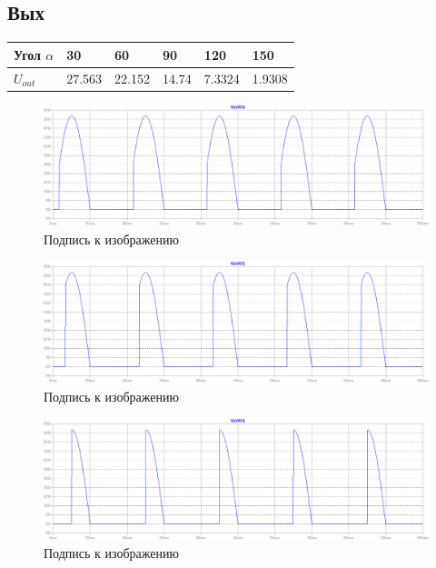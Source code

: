 \documentclass[a4paper, 12pt]{article}
\begin{document}
    \subsection{Вых}
    \begin{center}
    \begin{tabular}{ | m{4em} | m{1.5cm}| m{1.5cm} | m{1.5cm} | m{1.5cm} | m{1.5cm} | } 
    \hline
    Угол $\alpha$& 30 & 60 & 90 &120 &150 \\ 
    \hline
    $U_{out}$& 27.563 & 22.152 & 14.74 &7.3324 &1.9308\\ 
    \hline
    \end{tabular}
    \end{center}


    \begin{figure}[H]
        \centering
        \includegraphics[scale=0.45]{a30.png}
        \captionsetup{skip=0pt}
        \caption{Подпись к изображению}
        \label{fig:a30}
    \end{figure}
    \begin{figure}[H]
        \centering
        \includegraphics[scale=0.45]{a60.png}
        \captionsetup{skip=0pt}
        \caption{Подпись к изображению}
        \label{fig:a60}
    \end{figure}
    \begin{figure}[H]
        \centering
        \includegraphics[scale=0.45]{a90.png}
        \captionsetup{skip=0pt}
        \caption{Подпись к изображению}
        \label{fig:a90}
    \end{figure}
\end{document}
